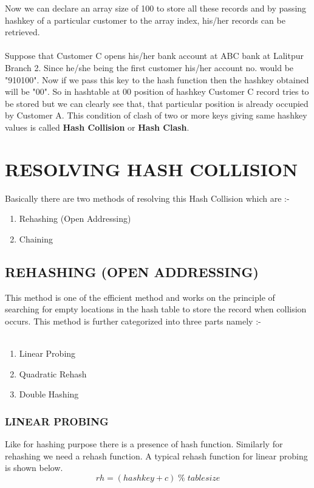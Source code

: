 \documentclass[12pt,a4paper]{article}
\begin{document}
\noindent Now we can declare an array size of 100 to store all these records and by passing hashkey of a particular customer to the array index, his/her records can be retrieved. \\ \\
Suppose that Customer C opens his/her bank account at ABC bank at Lalitpur Branch 2. Since he/she being the first customer his/her account no. would be "910100". Now if we pass this key to the hash function then the hashkey obtained will be "00". So in hashtable at 00 position of hashkey Customer C record tries to be stored but we can clearly see that, that particular position is already occupied by Customer A. This condition of clash of two or more keys giving same hashkey values is called \textbf{Hash Collision} or \textbf{Hash Clash}.


\section{RESOLVING HASH COLLISION}

Basically there are two methods of resolving this Hash Collision which are :-

\begin{enumerate}
	\item Rehashing (Open Addressing)
	\item Chaining
\end{enumerate}

\subsection{REHASHING (OPEN ADDRESSING)}
This method is one of the efficient method and works on the principle of searching for empty locations in the hash table to store the record when collision occurs. This method is further categorized into three parts namely :- \\ \\

\begin{enumerate}
	\item Linear Probing
	\item Quadratic Rehash
	\item Double Hashing
\end{enumerate}

\subsubsection{LINEAR PROBING}
Like for hashing purpose there is a presence of hash function. Similarly for rehashing we need a rehash function. A typical rehash function for linear probing is shown below.
$$rh = (hashkey + c) \; \% \; tablesize$$
\end{document}
